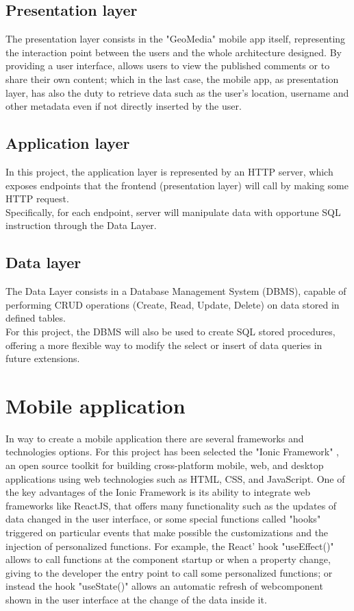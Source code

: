 \documentclass[conference]{IEEEtran}
\begin{document}
\subsection{Presentation layer}
The presentation layer consists in the "GeoMedia" mobile app itself, representing the interaction point between the users and the whole architecture designed.
By providing a user interface, allows users to view the published comments or to share their own content; which in the last case, the mobile app, as presentation layer, has also the duty to retrieve data such as the user's location, username and other metadata even if not directly inserted by the user.
\subsection{Application layer}

In this project, the application layer is represented by an HTTP server, which exposes endpoints that the frontend (presentation layer) will call by making some HTTP request.
\\
Specifically, for each endpoint, server will manipulate data with opportune SQL instruction through the Data Layer.

\subsection{Data layer}

The Data Layer consists in a Database Management System (DBMS), capable of performing CRUD operations (Create, Read, Update, Delete) on data stored in defined tables.
\\
For this project, the DBMS will also be used to create SQL stored procedures, offering a more flexible way to modify the select or insert of data queries in future extensions.


\section{Mobile application}
In way to create a mobile application there are several frameworks and technologies options. For this project has been selected the "Ionic Framework" \cite{b1}, an open source toolkit for building cross-platform mobile, web, and desktop applications using web technologies such as HTML, CSS, and JavaScript.
One of the key advantages of the Ionic Framework is its ability to integrate web frameworks like ReactJS, that offers many functionality such as the updates of data changed in the user interface, or some special functions called "hooks" triggered on particular events that make possible the customizations and the injection of personalized functions.
For example, the React' hook "useEffect()" allows to call functions at the component startup or when a property change, giving to the developer the entry point to call some personalized functions; or instead the hook "useState()" allows an automatic refresh of webcomponent shown in the user interface at the change of the data inside it.
\end{document}
